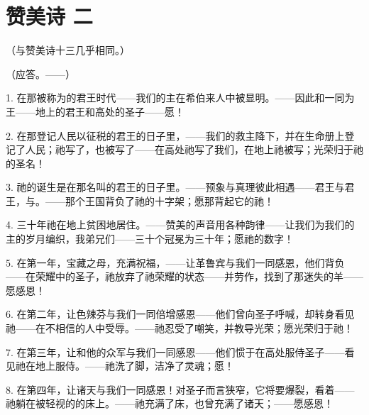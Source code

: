 
\section{赞美诗 二}

（与赞美诗十三几乎相同。）\par

（应答。——）\par

1. 在那被称为的君王时代——我们的主在希伯来人中被显明。——因此和一同为王——地上的君王和高处的圣子——愿！\par

2. 在那登记人民以征税的君王的日子里，——我们的救主降下，并在生命册上登记了人民；祂写了，也被写了——在高处祂写了我们，在地上祂被写；光荣归于祂的圣名！\par

3. 祂的诞生是在那名叫的君王的日子里。——预象与真理彼此相遇——君王与君王，与。——那个王国背负了祂的十字架；愿那背起它的祂！\par

4. 三十年祂在地上贫困地居住。——赞美的声音用各种韵律——让我们为我们的主的岁月编织，我弟兄们——三十个冠冕为三十年；愿祂的数字！\par

5. 在第一年，宝藏之母，充满祝福，——让革鲁宾与我们一同感恩，他们背负——在荣耀中的圣子，祂放弃了祂荣耀的状态——并劳作，找到了那迷失的羊——愿感恩！\par

6. 在第二年，让色辣芬与我们一同倍增感恩——他们曾向圣子呼喊，却转身看见祂——在不相信的人中受辱。——祂忍受了嘲笑，并教导光荣；愿光荣归于祂！\par

7. 在第三年，让和他的众军与我们一同感恩——他们惯于在高处服侍圣子——看见祂在地上服侍。——祂洗了脚，洁净了灵魂；愿！\par

8. 在第四年，让诸天与我们一同感恩！对圣子而言狭窄，它将要爆裂，看着——祂躺在被轻视的的床上。——祂充满了床，也曾充满了诸天；——愿感恩！\par

